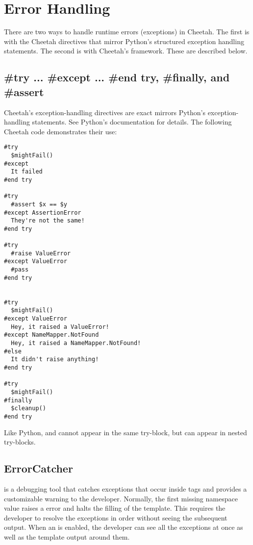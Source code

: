 \section{Error Handling}
\label{errorHandling}

There are two ways to handle runtime errors (exceptions) in Cheetah.  The first
is with the Cheetah directives that mirror Python's structured exception
handling statements. The second is with Cheetah's 
framework. These are described below.

\subsection{\#try ... \#except ... \#end try, \#finally, and \#assert}
\label{errorHandling.directives}

Cheetah's exception-handling directives are exact mirrors Python's 
exception-handling statements.  See Python's documentation for details.  The
following Cheetah code demonstrates their use:


\begin{verbatim}
#try
  $mightFail()
#except
  It failed
#end try

#try
  #assert $x == $y
#except AssertionError
  They're not the same!
#end try

#try
  #raise ValueError
#except ValueError
  #pass
#end try


#try
  $mightFail()
#except ValueError
  Hey, it raised a ValueError!
#except NameMapper.NotFound
  Hey, it raised a NameMapper.NotFound!
#else
  It didn't raise anything!
#end try

#try
  $mightFail()
#finally
  $cleanup()
#end try
\end{verbatim}    

Like Python,  and  cannot appear in the same
try-block, but can appear in nested try-blocks.


\subsection{ErrorCatcher}
\label{errorHandling.errorCatcher}

 is a debugging tool that catches exceptions that occur
inside  tags and provides a customizable warning to the
developer.  Normally, the first missing namespace value raises a
 error and halts the filling of the template. This
requires the developer to resolve the exceptions in order without seeing the
subsequent output. When an  is enabled, the developer can
see all the exceptions at once as well as the template output around them.

